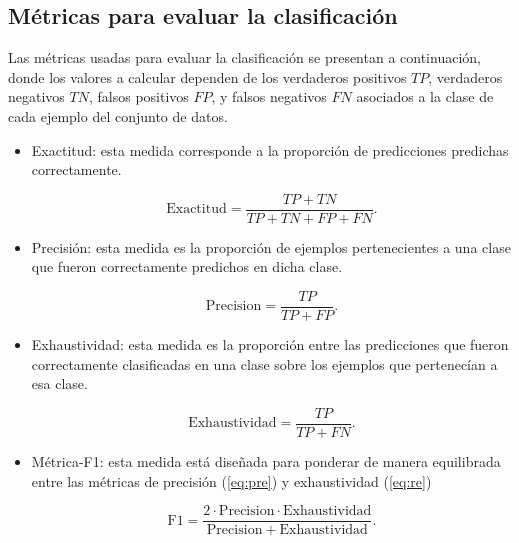 \subsection{Métricas para evaluar la clasificación}
Las métricas usadas para evaluar la clasificación se presentan a continuación, donde los valores a calcular dependen de los verdaderos positivos $TP$, verdaderos negativos $TN$, falsos positivos $FP$, y falsos negativos $FN$ asociados a la clase de cada ejemplo del conjunto de datos.


\begin{itemize}
    \item Exactitud: esta medida corresponde a la proporción de predicciones predichas correctamente.

    \begin{equation}
        \mathrm{Exactitud}= \frac{TP+TN}{TP+TN+FP+FN}.
        \label{eq:acc}
    \end{equation}


    \item Precisión: esta medida es la proporción de ejemplos pertenecientes a una clase que fueron correctamente predichos en dicha clase.
    
        \begin{equation}
            \mathrm{Precision} = \frac{TP}{TP+FP}.
            \label{eq:pre}
        \end{equation}
        
    \item Exhaustividad: esta medida es la proporción entre las predicciones que fueron correctamente clasificadas en una clase sobre los ejemplos que pertenecían a esa clase.
    
    \begin{equation}
        \mathrm{Exhaustividad}= \frac{TP}{TP+FN}.
        \label{eq:re}
    \end{equation}

    \item Métrica-F1: esta medida está diseñada para ponderar de manera equilibrada entre las métricas de precisión (\ref{eq:pre}) y exhaustividad (\ref{eq:re}) 
    
    \begin{equation}
        \mathrm{F1} = \frac{2\cdot\mathrm{Precision}\cdot\mathrm{Exhaustividad}}{\mathrm{Precision}+\mathrm{Exhaustividad}}.
        \label{eq:f1}
    \end{equation}

\end{itemize}

